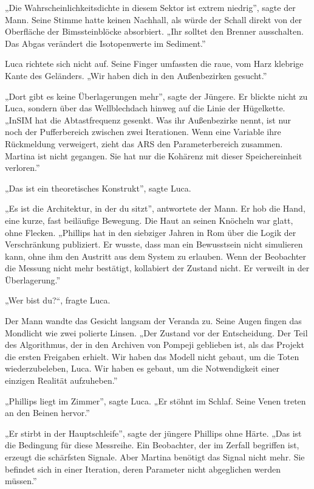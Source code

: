 \documentclass[
  ngerman,
]{article}
\begin{document}
„Die Wahrscheinlichkeitsdichte in diesem Sektor ist extrem niedrig'',
sagte der Mann. Seine Stimme hatte keinen Nachhall, als würde der Schall
direkt von der Oberfläche der Bimssteinblöcke absorbiert. „Ihr solltet
den Brenner ausschalten. Das Abgas verändert die Isotopenwerte im
Sediment.''

Luca richtete sich nicht auf. Seine Finger umfassten die raue, vom Harz
klebrige Kante des Geländers. „Wir haben dich in den Außenbezirken
gesucht.''

„Dort gibt es keine Überlagerungen mehr'', sagte der Jüngere. Er blickte
nicht zu Luca, sondern über das Wellblechdach hinweg auf die Linie der
Hügelkette. „InSIM hat die Abtastfrequenz gesenkt. Was ihr Außenbezirke
nennt, ist nur noch der Pufferbereich zwischen zwei Iterationen. Wenn
eine Variable ihre Rückmeldung verweigert, zieht das ARS den
Parameterbereich zusammen. Martina ist nicht gegangen. Sie hat nur die
Kohärenz mit dieser Speichereinheit verloren.''

„Das ist ein theoretisches Konstrukt'', sagte Luca.

„Es ist die Architektur, in der du sitzt'', antwortete der Mann. Er hob
die Hand, eine kurze, fast beiläufige Bewegung. Die Haut an seinen
Knöcheln war glatt, ohne Flecken. „Phillips hat in den siebziger Jahren
in Rom über die Logik der Verschränkung publiziert. Er wusste, dass man
ein Bewusstsein nicht simulieren kann, ohne ihm den Austritt aus dem
System zu erlauben. Wenn der Beobachter die Messung nicht mehr
bestätigt, kollabiert der Zustand nicht. Er verweilt in der
Überlagerung.''

„Wer bist du?{\kern0pt}``, fragte Luca.

Der Mann wandte das Gesicht langsam der Veranda zu. Seine Augen fingen
das Mondlicht wie zwei polierte Linsen. „Der Zustand vor der
Entscheidung. Der Teil des Algorithmus, der in den Archiven von Pompeji
geblieben ist, als das Projekt die ersten Freigaben erhielt. Wir haben
das Modell nicht gebaut, um die Toten wiederzubeleben, Luca. Wir haben
es gebaut, um die Notwendigkeit einer einzigen Realität aufzuheben.''

„Phillips liegt im Zimmer'', sagte Luca. „Er stöhnt im Schlaf. Seine
Venen treten an den Beinen hervor.''

„Er stirbt in der Hauptschleife'', sagte der jüngere Phillips ohne
Härte. „Das ist die Bedingung für diese Messreihe. Ein Beobachter, der
im Zerfall begriffen ist, erzeugt die schärfsten Signale. Aber Martina
benötigt das Signal nicht mehr. Sie befindet sich in einer Iteration,
deren Parameter nicht abgeglichen werden müssen.''
\end{document}
